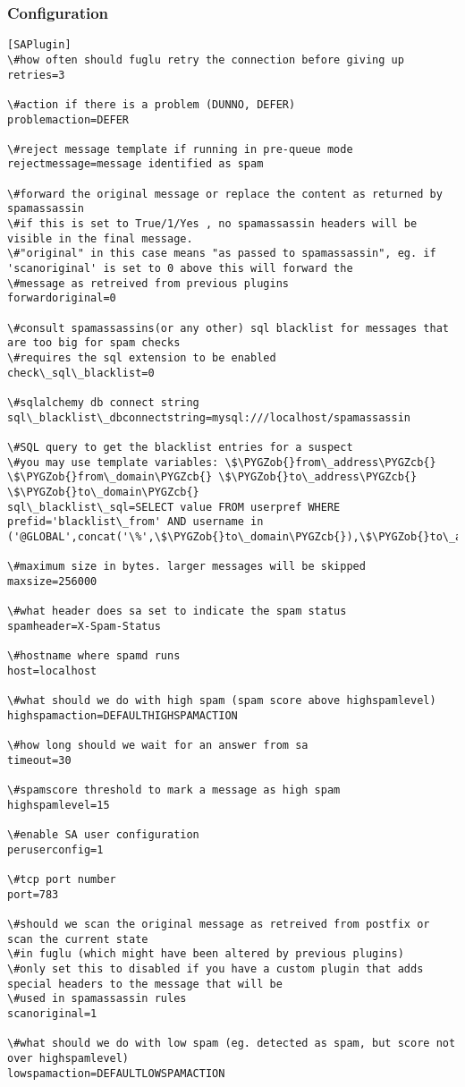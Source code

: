 \documentclass[letterpaper,10pt,english]{sphinxmanual}
\def\PYGZob{\char`\{}
\def\PYGZcb{\char`\}}
\begin{document}
\subsubsection{Configuration}
\label{plugins-index:configuration}
\begin{Verbatim}[commandchars=\\\{\}]
[SAPlugin]
\#how often should fuglu retry the connection before giving up
retries=3

\#action if there is a problem (DUNNO, DEFER)
problemaction=DEFER

\#reject message template if running in pre-queue mode
rejectmessage=message identified as spam

\#forward the original message or replace the content as returned by spamassassin
\#if this is set to True/1/Yes , no spamassassin headers will be visible in the final message.
\#"original" in this case means "as passed to spamassassin", eg. if 'scanoriginal' is set to 0 above this will forward the
\#message as retreived from previous plugins
forwardoriginal=0

\#consult spamassassins(or any other) sql blacklist for messages that are too big for spam checks
\#requires the sql extension to be enabled
check\_sql\_blacklist=0

\#sqlalchemy db connect string
sql\_blacklist\_dbconnectstring=mysql:///localhost/spamassassin

\#SQL query to get the blacklist entries for a suspect
\#you may use template variables: \$\PYGZob{}from\_address\PYGZcb{} \$\PYGZob{}from\_domain\PYGZcb{} \$\PYGZob{}to\_address\PYGZcb{} \$\PYGZob{}to\_domain\PYGZcb{}
sql\_blacklist\_sql=SELECT value FROM userpref WHERE prefid='blacklist\_from' AND username in ('@GLOBAL',concat('\%',\$\PYGZob{}to\_domain\PYGZcb{}),\$\PYGZob{}to\_address\PYGZcb{})

\#maximum size in bytes. larger messages will be skipped
maxsize=256000

\#what header does sa set to indicate the spam status
spamheader=X-Spam-Status

\#hostname where spamd runs
host=localhost

\#what should we do with high spam (spam score above highspamlevel)
highspamaction=DEFAULTHIGHSPAMACTION

\#how long should we wait for an answer from sa
timeout=30

\#spamscore threshold to mark a message as high spam
highspamlevel=15

\#enable SA user configuration
peruserconfig=1

\#tcp port number
port=783

\#should we scan the original message as retreived from postfix or scan the current state
\#in fuglu (which might have been altered by previous plugins)
\#only set this to disabled if you have a custom plugin that adds special headers to the message that will be
\#used in spamassassin rules
scanoriginal=1

\#what should we do with low spam (eg. detected as spam, but score not over highspamlevel)
lowspamaction=DEFAULTLOWSPAMACTION
\end{Verbatim}
\end{document}
